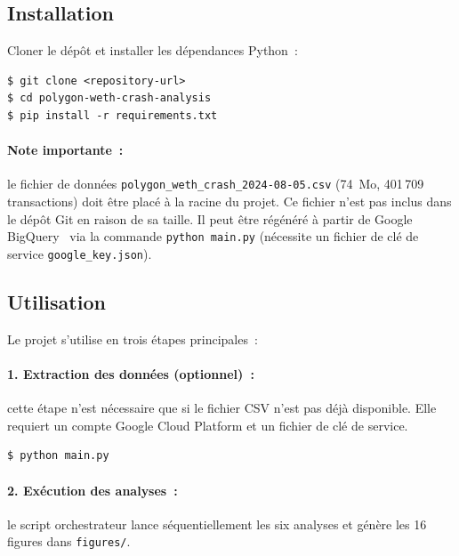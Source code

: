 
\subsection{Installation}

Cloner le d\'ep\^ot et installer les d\'ependances Python~:

\begin{lstlisting}[language={}, numbers=none, caption={Clonage et installation}]
$ git clone <repository-url>
$ cd polygon-weth-crash-analysis
$ pip install -r requirements.txt
\end{lstlisting}

\paragraph{Note importante~:} le fichier de donn\'ees \texttt{polygon\_weth\_crash\_2024-08-05.csv} (74~Mo, 401\,709 transactions) doit \^etre plac\'e \`a la racine du projet. Ce fichier n'est pas inclus dans le d\'ep\^ot Git en raison de sa taille. Il peut \^etre r\'eg\'en\'er\'e \`a partir de Google BigQuery~\cite{bigquery_public} via la commande \texttt{python main.py} (n\'ecessite un fichier de cl\'e de service \texttt{google\_key.json}).


\subsection{Utilisation}

Le projet s'utilise en trois \'etapes principales~:

\paragraph{1. Extraction des donn\'ees (optionnel)~:} cette \'etape n'est n\'ecessaire que si le fichier CSV n'est pas d\'ej\`a disponible. Elle requiert un compte Google Cloud Platform et un fichier de cl\'e de service.

\begin{lstlisting}[language={}, numbers=none, caption={Extraction des donn\'ees depuis BigQuery}]
$ python main.py
\end{lstlisting}

\paragraph{2. Ex\'ecution des analyses~:} le script orchestrateur lance s\'equentiellement les six analyses et g\'en\`ere les 16 figures dans \texttt{figures/}.

